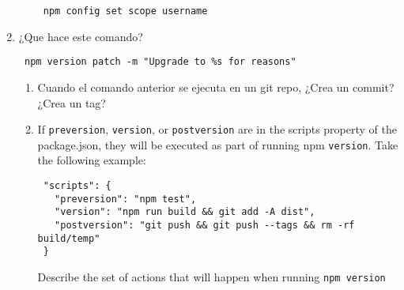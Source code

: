 \begin{enumerate}
\begin{enumerate}
\begin{verbatim}
 npm config set scope username
\end{verbatim}
  \end{enumerate}
\item
  ¿Que hace este comando?

\begin{verbatim}
 npm version patch -m "Upgrade to %s for reasons"
\end{verbatim}

  \begin{enumerate}
  \def\labelenumii{\arabic{enumii}.}
  \item
    Cuando el comando anterior se ejecuta en un git repo, ¿Crea un
    commit? ¿Crea un tag?
  \item
    If \texttt{preversion}, \texttt{version}, or \texttt{postversion}
    are in the scripts property of the package.json, they will be
    executed as part of running npm \texttt{version}. Take the following
    example:

\begin{verbatim}
 "scripts": {
   "preversion": "npm test",
   "version": "npm run build && git add -A dist",
   "postversion": "git push && git push --tags && rm -rf build/temp"
 }
\end{verbatim}

    Describe the set of actions that will happen when running
    \texttt{npm version}
  \end{enumerate}
\end{enumerate}
